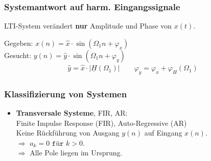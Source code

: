 \begin{multicols*}{2}
\subsubsection{Systemantwort auf harm. Eingangssignale}	
LTI-System verändert \textbf{nur} Amplitude und Phase von $x(t)$.

Gegeben: $x(n) = \hat{x} \cdot \sin(\Omega_1n+\varphi_x)$\\

Gesucht: $y(n) = \hat{y} \cdot \sin(\Omega_1n+\varphi_y)$\\
\begin{gather*}
\boxed{
\hat{y} = \hat{x} \cdot |\underline{H}(\Omega_1)|} \qquad
\boxed{
 \varphi_y = \varphi_x + \varphi_H(\Omega_1) } 
\end{gather*}




\subsubsection{Klassifizierung von Systemen}
\begin{itemize}
	\item \textbf{Transversale Systeme}, FIR, AR:\\
	{\small Finite Impulse Response (FIR), Auto-Regressive (AR)\\
		Keine Rückführung von Ausgang $y(n)$ auf Eingang $x(n)$.}\\
	$\Rightarrow$ $a_k=0 \texttt{ für } k>0$.\\
	$\Rightarrow$ Alle Pole liegen im Ursprung.
	

\end{itemize}
\end{multicols*}
